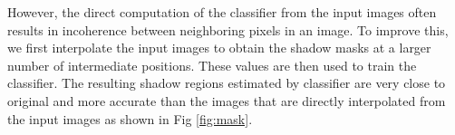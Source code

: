 However, the direct computation of the classifier from the input images often
results in incoherence between neighboring pixels in an image. To improve this,
we first interpolate the input images to obtain the shadow masks at a larger
number of intermediate positions. These values are then used to train the
classifier. The resulting shadow regions estimated by classifier are very close
to original and more accurate than the images that are directly interpolated
from the input images as shown in Fig \ref{fig:mask}.




\begin{figure}[h]
\centering {} 
\end{figure}
